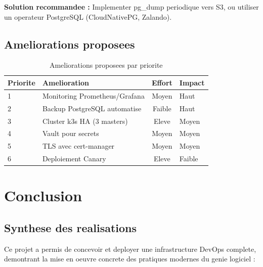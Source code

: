 \documentclass[12pt,a4paper,french]{report}
\begin{document}
\textbf{Solution recommandee :} Implementer pg\_dump periodique vers S3, ou utiliser un operateur PostgreSQL (CloudNativePG, Zalando).

\section{Ameliorations proposees}

\begin{table}[H]
    \centering
    \begin{tabular}{|l|l|c|l|}
        \hline
        \textbf{Priorite} & \textbf{Amelioration} & \textbf{Effort} & \textbf{Impact} \\
        \hline
        1 & Monitoring Prometheus/Grafana & Moyen & Haut \\
        2 & Backup PostgreSQL automatise & Faible & Haut \\
        3 & Cluster k3s HA (3 masters) & Eleve & Moyen \\
        4 & Vault pour secrets & Moyen & Moyen \\
        5 & TLS avec cert-manager & Moyen & Moyen \\
        6 & Deploiement Canary & Eleve & Faible \\
        \hline
    \end{tabular}
    \caption{Ameliorations proposees par priorite}
    \label{table:ameliorations}
\end{table}

\chapter{Conclusion}

\section{Synthese des realisations}

Ce projet a permis de concevoir et deployer une infrastructure DevOps complete, demontrant la mise en oeuvre concrete des pratiques modernes du genie logiciel :
\end{document}
